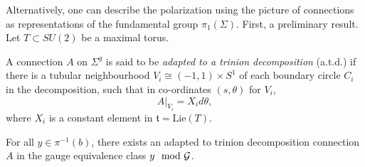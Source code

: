 	Alternatively, one can describe the polarization using the picture of connections as representations of the fundamental group $\pi_1(\Sigma)$. First, a preliminary result. Let $T\subset SU(2)$ be a maximal torus.
	\begin{definition}
		\label{d:atd-conn}
		A connection $A$ on $\Sigma^g$ is said to be \emph{adapted to a trinion decomposition} (a.t.d.) if there is a tubular neighbourhood $V_i \cong (-1,1)\times S^1$ of each boundary circle $C_i$ in the decomposition, such that in co-ordinates $(s,\theta)$ for $V_i$,
		\begin{equation}
			A|_{V_i} = X_i d\theta, 
		\end{equation}
		where $X_i$ is a constant element in $\mathfrak{t} = \text{Lie}(T)$.
	\end{definition}
	\begin{theorem}
		\label{t:atd-thm}
		For all $y\in \pi^{-1}(b)$, there exists an adapted to trinion decomposition connection $A$ in the gauge equivalence class $y \mod {\mathcal{G}}$.
	\end{theorem}
